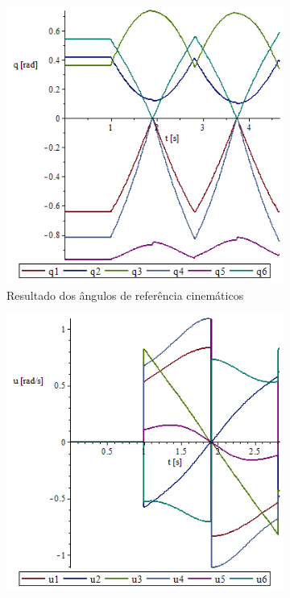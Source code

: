 \begin{figure}[h]
    \centering
    \begin{subfigure}[b]{0.45\textwidth}
        \includegraphics[width=\textwidth]{figs/qxt_exemplo}
        \caption{Resultado dos ângulos de referência cinemáticos}
        \label{fig::qxt_exemplo}
    \end{subfigure}
    \quad %
    \begin{subfigure}[b]{0.45\textwidth}
        \includegraphics[width=\textwidth]{figs/uxt_exemplo}

\end{subfigure}
\end{figure}
